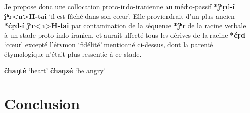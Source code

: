 \documentclass{article}
\newcommand{\ipa}[1]{{\phon\textbf{#1}}}
\begin{document}
Je propose donc une collocation proto-indo-iranienne au médio-passif \ipa{*j́ʰṛd-í j́ʰr<n>H-tai} `il est fâché dans son cœur'. Elle proviendrait d'un plus ancien \ipa{*ćṛd-í j́ʰr<n>H-tai} par contamination de la séquence \ipa{*j́ʰr} de la racine verbale à un stade proto-indo-iranien, et aurait affecté tous les dérivés de la racine \ipa{*ćṛd} `cœur' excepté l'étymon `fidélité' mentionné ci-dessus, dont la parenté étymologique n'était plus ressentie à ce stade.

\ipa{čhaŋté} `heart'  \ipa{čhaŋzé} `be angry'
\citet{ullrich08}


\section*{Conclusion}





\end{document}
